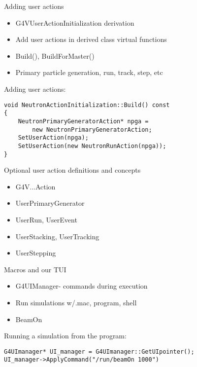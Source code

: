 \documentclass[aspectratio=169]{beamer}
\begin{document}
\begin{frame}[fragile]{Adding user actions}
  \begin{itemize}
  \item G4VUserActionInitialization derivation
  \item Add user actions in derived class virtual functions
  \item Build(), BuildForMaster()
  \item Primary particle generation, run, track, step, etc
  \end{itemize}

  \begin{block}{Adding user actions:}
    \begin{Verbatim}[fontsize=\small]
void NeutronActionInitialization::Build() const
{
    NeutronPrimaryGeneratorAction* npga =
        new NeutronPrimaryGeneratorAction;
    SetUserAction(npga);
    SetUserAction(new NeutronRunAction(npga));
}
    \end{Verbatim}
  \end{block}
\end{frame}

\begin{frame}[fragile]{Optional user action definitions and concepts}
  \begin{itemize}
  \item G4V...Action
  \item UserPrimaryGenerator
  \item UserRun, UserEvent
  \item UserStacking, UserTracking
  \item UserStepping
  \end{itemize}
\end{frame}

\begin{frame}[fragile]{Macros and our TUI}
  \begin{itemize}
  \item G4UIManager- commands during execution
  \item Run simulations w/.mac, program, shell
  \item BeamOn
  \end{itemize}

  \begin{block}{Running a simulation from the program:}
    \begin{Verbatim}[fontsize=\small]
G4UImanager* UI_manager = G4UImanager::GetUIpointer();
UI_manager->ApplyCommand("/run/beamOn 1000")
    \end{Verbatim}
  \end{block}
\end{frame}
\end{document}
